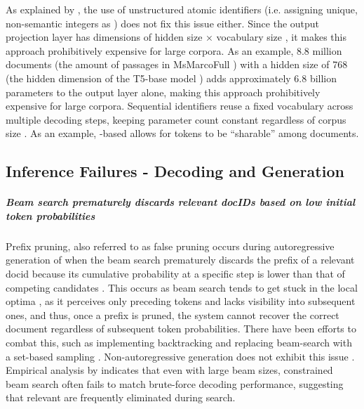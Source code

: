 As explained by \citet{yujia-zhou-ultron-an}, the use of unstructured atomic identifiers (i.e. assigning unique, non-semantic integers as ) does not fix this issue either. Since the output projection layer has dimensions of hidden size × vocabulary size \cite{reusch-reverseengineering-the,yi-tay-transformer-memory},
it makes this approach prohibitively expensive for large corpora. As an example, 8.8 million documents (the amount of passages in MsMarcoFull \cite{payal-bajaj-ms-marco}) with a hidden size of 768 (the hidden dimension of the T5-base model \cite{colin-raffel-exploring-the})
adds approximately 6.8 billion parameters to the output layer alone, making this approach prohibitively expensive for large corpora. Sequential identifiers reuse a fixed vocabulary across multiple decoding steps, keeping parameter count constant regardless of corpus size \cite{tzulin-kuo-a-survey,ronak-pradeep-how-does}. As an example, -based  allows for  tokens to be ``sharable'' among documents.

\subsection{Inference Failures - Decoding and Generation}

\subparagraph{Beam search prematurely discards relevant docIDs based on low initial token probabilities}

Prefix pruning, also referred to as false pruning occurs during autoregressive generation of  when the beam search prematurely discards the prefix of a relevant docid because its cumulative probability at a specific step is lower than that of competing candidates \cite{peitian-zhang-generative-retrieval,hansi-zeng-planning-ahead,weiwei-sun-learning-to,hansi-zeng-scalable-and}. This occurs as beam search tends to get stuck in the local optima \cite{felix-stahlberg-on-nmt}, as it perceives only preceding tokens and lacks visibility into subsequent ones, and thus, once a prefix is pruned, the system cannot recover the correct document regardless of subsequent token probabilities. There have been efforts to combat this, such as implementing backtracking \cite{r-zhou-beamstack-search} and replacing beam-search with a set-based sampling \cite{peitian-zhang-generative-retrieval}. Non-autoregressive generation does not exhibit this issue \cite{ravisri-valluri-scaling-the,xinpeng-zhao-diffugr-generative}. Empirical analysis by \citet{hansi-zeng-planning-ahead} indicates that even with large beam sizes, constrained beam search often fails to match brute-force decoding performance, suggesting that relevant  are frequently eliminated during search.

